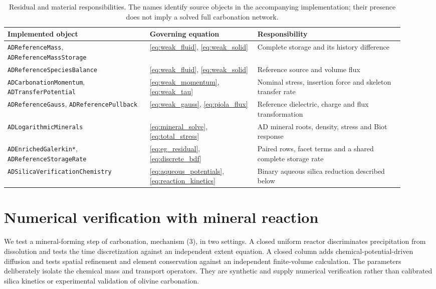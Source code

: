 \documentclass[11pt]{article}
\begin{document}
\begin{table}[htbp]
\centering\small
\begin{tabular}{p{0.33\linewidth}p{0.25\linewidth}p{0.34\linewidth}}
\toprule
Implemented object & Governing equation & Responsibility\\
\midrule
\texttt{ADReferenceMass}, \texttt{ADReferenceMassStorage} & \eqref{eq:weak_fluid}, \eqref{eq:weak_solid} & Complete storage and its history difference\\
\texttt{ADReferenceSpeciesBalance} & \eqref{eq:weak_fluid}, \eqref{eq:weak_solid} & Reference source and volume flux\\
\texttt{ADCarbonationMomentum}, \texttt{ADTransferPotential} & \eqref{eq:weak_momentum}, \eqref{eq:weak_tau} & Nominal stress, insertion force and skeleton transfer rate\\
\texttt{ADReferenceGauss}, \texttt{ADReferencePullback} & \eqref{eq:weak_gauss}, \eqref{eq:piola_flux} & Reference dielectric, charge and flux transformation\\
\texttt{ADLogarithmicMinerals} & \eqref{eq:mineral_solve}, \eqref{eq:total_stress} & AD mineral roots, density, stress and Biot response\\
\texttt{ADEnrichedGalerkin*}, \texttt{ADReferenceStorageRate} & \eqref{eq:eg_residual}, \eqref{eq:discrete_bdf} & Paired rows, facet terms and a shared complete storage rate\\
\texttt{ADSilicaVerificationChemistry} & \eqref{eq:aqueous_potentials}, \eqref{eq:reaction_kinetics} & Binary aqueous silica reduction described below\\
\bottomrule
\end{tabular}
\caption{Residual and material responsibilities. The names identify source objects in the accompanying implementation; their presence does not imply a solved full carbonation network.}
\label{tab:implementation}
\end{table}

\section{Numerical verification with mineral reaction}
\label{sec:reaction_verification}
We test a mineral-forming step of carbonation, mechanism (3), in two settings. A closed uniform reactor discriminates precipitation from dissolution and tests the time discretization against an independent extent equation. A closed column adds chemical-potential-driven diffusion and tests spatial refinement and element conservation against an independent finite-volume calculation. The parameters deliberately isolate the chemical mass and transport operators. They are synthetic and supply numerical verification rather than calibrated silica kinetics or experimental validation of olivine carbonation.
\end{document}
